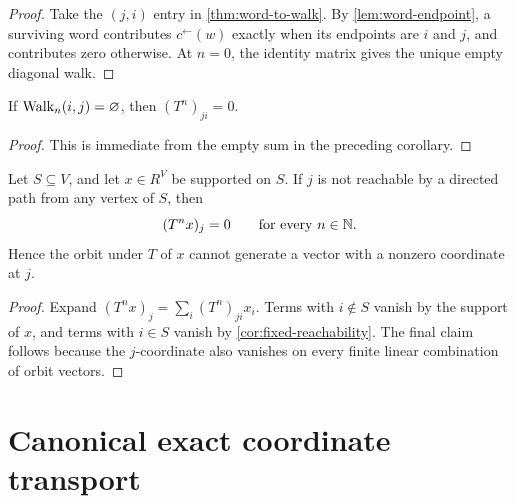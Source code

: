 \begin{proof}
Take the $(j,i)$ entry in \cref{thm:word-to-walk}.  By
\cref{lem:word-endpoint}, a surviving word contributes
$c^\leftarrow(w)$ exactly when its endpoints are $i$ and $j$, and contributes
zero otherwise.  At $n=0$, the identity matrix gives the unique empty
diagonal walk.
\end{proof}

\begin{corollary}
\label{cor:fixed-reachability}
If $\operatorname{Walk}_n(i,j)=\varnothing$, then $(T^n)_{ji}=0$.
\end{corollary}

\begin{proof}
This is immediate from the empty sum in the preceding corollary.
\end{proof}

\begin{corollary}
\label{cor:orbit-reachability}
Let $S\subseteq V$, and let $x\in R^V$ be supported on $S$.  If $j$ is not
reachable by a directed path from any vertex of $S$, then
\[
  (T^nx)_j=0\qquad\text{for every }n\in\mathbb N.
\]
Hence the orbit under $T$ of $x$ cannot generate a vector with a nonzero
coordinate at $j$.
\end{corollary}

\begin{proof}
Expand $(T^nx)_j=\sum_i(T^n)_{ji}x_i$.  Terms with $i\notin S$ vanish by
the support of $x$, and terms with $i\in S$ vanish by
\cref{cor:fixed-reachability}.  The final claim follows because the
$j$-coordinate also vanishes on every finite linear combination of orbit
vectors.
\end{proof}

\section{Canonical exact coordinate transport}
\label{sec:canonical-transport}

